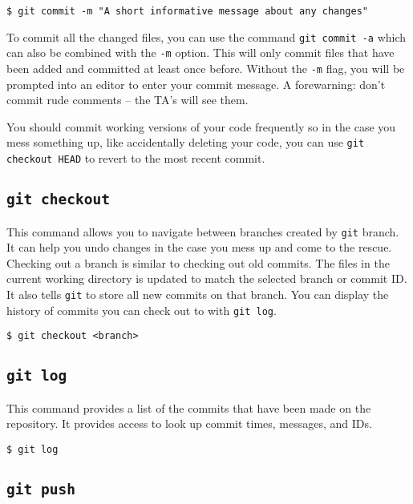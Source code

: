 \documentclass[11pt]{article}
\begin{document}
\begin{lstlisting}[style=bashstyle]
  $ git commit -m "A short informative message about any changes"
\end{lstlisting}

To commit all the changed files, you can use the command \texttt{git commit -a}
which can also be combined with the \texttt{-m} option. This will only commit
files that have been added and committed at least once before. Without the
\texttt{-m} flag, you will be prompted into an editor to enter your commit
message. A forewarning: don't commit rude comments -- the TA's will see them.

You should commit working versions of your code frequently so in the case you
mess something up, like accidentally deleting your code, you can use \texttt{git
checkout HEAD} to revert to the most recent commit.

\subsection{\texttt{git checkout}}

This command allows you to navigate between branches created by \texttt{git}
branch. It can help you undo changes in the case you mess up and come to the
rescue. Checking out a branch is similar to checking out old commits. The files
in the current working directory is updated to match the selected branch or
commit ID. It also tells \texttt{git} to store all new commits on that branch.
You can display the history of commits you can check out to with \texttt{git
log}.

\begin{lstlisting}[style=bashstyle]
  $ git checkout <branch>
\end{lstlisting}


\subsection{\texttt{git log}}

This command provides a list of the commits that have been made on the
repository. It provides access to look up commit times, messages, and IDs.

\begin{lstlisting}[style=bashstyle]
  $ git log
\end{lstlisting}


\subsection{\texttt{git push}}
\end{document}
